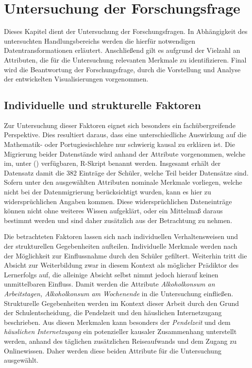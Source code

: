 \chapter[Untersuchung der Forschungsfrage]{Untersuchung der Forschungsfrage}

Dieses Kapitel dient der Untersuchung der Forschungsfragen. 
In Abhängigkeit des untersuchten Handlungsbereichs werden die hierfür notwendigen Datentransformationen erläutert. 
Anschließend gilt es aufgrund der Vielzahl an Attributen, die für die Untersuchung relevanten Merkmale zu identifizieren. 
Final wird die Beantwortung der Forschungsfrage, durch die Vorstellung und Analyse der entwickelten Visualisierungen vorgenommen.

\section{Individuelle und strukturelle Faktoren}

Zur Untersuchung dieser Faktoren eignet sich besonders ein fachübergreifende Perspektive. 
Dies resultiert daraus, dass eine unterschiedliche Auswirkung auf die Mathematik- oder Portugiesischlehre nur schwierig kausal zu erklären ist.
Die Migrierung beider Datenstände wird anhand der Attribute vorgenommen, welche im, unter (\cite[]{student_performance}) verfügbaren, R-Skript benannt werden.
Insgesamt erhält der Datensatz damit die 382 Einträge der Schüler, welche Teil beider Datensätze sind. 
Sofern unter den ausgewählten Attributen nominale Merkmale vorliegen, welche nicht bei der Datenmigrierung berücksichtigt wurden, kann es hier zu widersprüchlichen Angaben kommen.
Diese widersprüchlichen Dateneinträge können nicht ohne weiteres Wissen aufgeklärt, oder ein Mittelmaß daraus bestimmt werden und sind daher zusätzlich aus der Betrachtung zu nehmen.

Die betrachteten Faktoren lassen sich nach individuellen Verhaltensweisen und der strukturellen Gegebenheiten aufteilen.
Individuelle Merkmale werden nach der Möglichkeit zur Einflussnahme durch den Schüler gefiltert.
Weiterhin tritt die Absicht zur Weiterbildung zwar in diesem Kontext als möglicher Prädiktor des Lernerfolgs auf, die alleinige Absicht selbst nimmt jedoch hierauf keinen unmittelbaren Einfluss.
Damit werden die Attribute \textit{Alkoholkonsum an Arbeitstagen, Alkoholkonsum am Wochenende} in die Untersuchung einfließen.
Strukturelle Gegebenheiten werden im Kontext dieser Arbeit durch den Grund der Schulentscheidung, die Pendelzeit und den häuslichen Internetzugang beschrieben.
Aus diesen Merkmalen kann besonders der \textit{Pendelzeit} und dem \textit{häuslichen Internetzugang} ein potenzieller kausaler Zusammenhang unterstellt werden, anhand des täglichen zusätzlichen Reiseaufwands und dem Zugang zu Onlinewissen.
Daher werden diese beiden Attribute für die Untersuchung ausgewählt.

